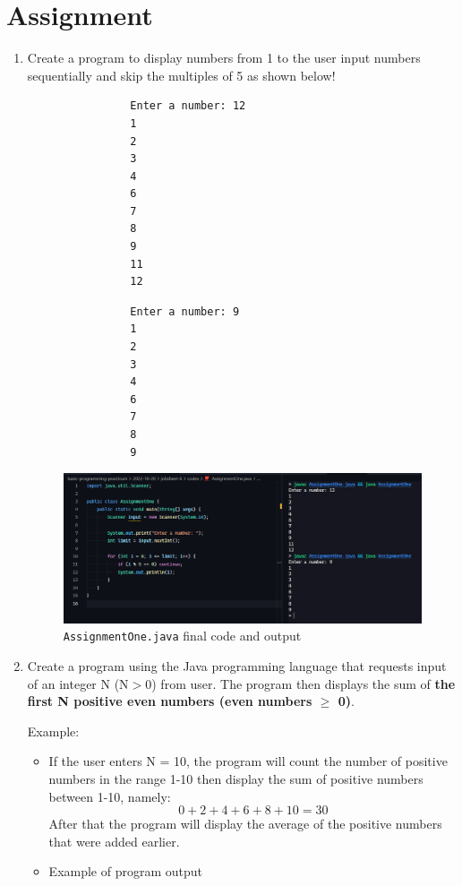 \documentclass[12pt,titlepage]{article}
\begin{document}
\pagebreak

\section{Assignment}
\begin{enumerate}
    \item {
        Create a program to display numbers from 1 to the user input numbers sequentially and skip the multiples of 5 as shown below!

        \begin{multicols}{2}
            \begin{verbatim}
                Enter a number: 12
                1
                2
                3
                4
                6
                7
                8
                9
                11
                12
            \end{verbatim}
            \columnbreak
            \begin{verbatim}
                Enter a number: 9
                1
                2
                3
                4
                6
                7
                8
                9
            \end{verbatim}
        \end{multicols}

        \begin{figure}[h]
            \centering
            \includegraphics[width=.9\textwidth]{./images/assignment-one.png}
            \caption{\texttt{AssignmentOne.java} final code and output}
        \end{figure}
    }
    \item {
        Create a program using the Java programming language that requests input of an integer N (N$>$0) from user.
        The program then displays the sum of \textbf{the first N positive even numbers (even numbers $\geq$ 0)}.

        Example:
        \begin{itemize}
            \item {
                If the user enters N = 10, the program will count the number of positive numbers in the range 1-10 then display the sum of
                positive numbers between 1-10, namely:
                \[
                    0 + 2 + 4 + 6 + 8 + 10 = 30
                \]
                After that the program will display the average of the positive numbers that were added earlier.
            }
            \item {
                Example of program output

}
\end{itemize}}
\end{enumerate}
\end{document}
